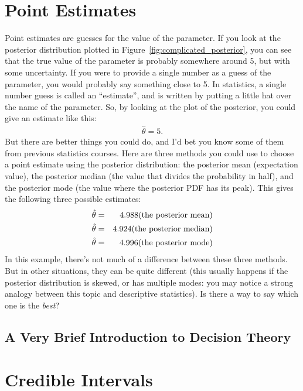 \section{Point Estimates}
Point estimates are guesses for the value of the parameter. If you look at the
posterior distribution plotted in Figure~\ref{fig:complicated_posterior}, you
can see that the true value of the parameter is probably somewhere around 5,
but with some uncertainty. If you were to provide a single number as a guess of
the parameter, you would probably say something close to 5. In statistics, a
single number guess is called an ``estimate'', and is written by putting a
little hat over the name of the parameter. So, by looking at the plot of the
posterior, you could give an estimate like this:
\begin{eqnarray}
\hat{\theta} = 5.
\end{eqnarray}
But there are better things you could do, and I'd bet you know some of them
from previous statistics courses. Here are three methods you could use to
choose a point estimate using the posterior distribution: the posterior mean
(expectation value), the posterior median (the value that divides the probability
in half), and the posterior mode (the value where the posterior PDF has its
peak). This gives the following three possible estimates:
\begin{eqnarray}
\hat{\theta} &=& 4.988 \textnormal{(the posterior mean)}\\
\hat{\theta} &=& 4.924 \textnormal{(the posterior median)}\\
\hat{\theta} &=& 4.996 \textnormal{(the posterior mode)}
\end{eqnarray}
In this example, there's not much of a difference between these three methods.
But in other situations, they can be quite different (this usually happens if
the posterior distribution is skewed, or has multiple modes: you may notice a
strong analogy between this topic and descriptive statistics). Is there a way
to say which one is the {\it best}?

\subsection{A Very Brief Introduction to Decision Theory}









\section{Credible Intervals}




